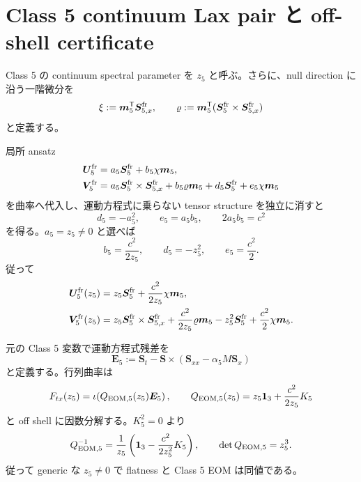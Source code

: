 \section{Class 5 continuum Lax pair と off-shell certificate}
Class 5 の continuum spectral parameter を $z_5$ と呼ぶ。さらに、null direction に沿う一階微分を
\begin{equation}
\xi:=\boldsymbol m_5^{\mathsf T}\boldsymbol S_{5,x}^{\rm fr},
\qquad
\varrho:=\boldsymbol m_5^{\mathsf T}(\boldsymbol S_5^{\rm fr}\times\boldsymbol S_{5,x}^{\rm fr})
\label{eq:xirho}
\end{equation}
と定義する。

局所 ansatz
\begin{align}
\boldsymbol U_5^{\rm fr}&=a_5\boldsymbol S_5^{\rm fr}+b_5\chi\boldsymbol m_5,
\\
\boldsymbol V_5^{\rm fr}&=a_5\boldsymbol S_5^{\rm fr}\times\boldsymbol S_{5,x}^{\rm fr}
+b_5\varrho\boldsymbol m_5+d_5\boldsymbol S_5^{\rm fr}+e_5\chi\boldsymbol m_5
\label{eq:ansatz5}
\end{align}
を曲率へ代入し、運動方程式に乗らない tensor structure を独立に消すと
\begin{equation}
d_5=-a_5^2,\qquad e_5=a_5b_5,\qquad 2a_5b_5=c^2
\label{eq:coeff5}
\end{equation}
を得る。$a_5=z_5\neq0$ と選べば
\begin{equation}
b_5=\frac{c^2}{2z_5},\qquad d_5=-z_5^2,\qquad e_5=\frac{c^2}{2}.
\end{equation}
従って
\begin{align}
\boldsymbol U_5^{\rm fr}(z_5)&=z_5\boldsymbol S_5^{\rm fr}
+\frac{c^2}{2z_5}\chi\boldsymbol m_5,
\label{eq:U5fr}\\
\boldsymbol V_5^{\rm fr}(z_5)&=z_5\boldsymbol S_5^{\rm fr}\times\boldsymbol S_{5,x}^{\rm fr}
+\frac{c^2}{2z_5}\varrho\boldsymbol m_5-z_5^2\boldsymbol S_5^{\rm fr}
+\frac{c^2}{2}\chi\boldsymbol m_5.
\label{eq:V5fr}
\end{align}

元の Class 5 変数で運動方程式残差を
\begin{equation}
\boldsymbol E_5:=\boldsymbol S_t-\boldsymbol S\times(\boldsymbol S_{xx}-\alpha_5M\boldsymbol S_x)
\label{eq:E5res}
\end{equation}
と定義する。行列曲率は
\begin{equation}
F_{tx}(z_5)=\iota\!\left(Q_{{\rm EOM},5}(z_5)\boldsymbol E_5\right),
\qquad
Q_{{\rm EOM},5}(z_5)=z_5\mathbf 1_{3}+\frac{c^2}{2z_5}K_5
\label{eq:QE5}
\end{equation}
と off shell に因数分解する。$K_5^2=0$ より
\begin{equation}
Q_{{\rm EOM},5}^{-1}=\frac1{z_5}\left(\mathbf 1_{3}-\frac{c^2}{2z_5^2}K_5\right),
\qquad
\det Q_{{\rm EOM},5}=z_5^3.
\label{eq:QEinv5}
\end{equation}
従って generic な $z_5\neq0$ で flatness と Class 5 EOM は同値である。

